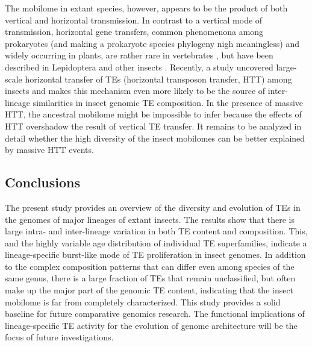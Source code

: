 The mobilome in extant species, however, appears to be the product of
both vertical and horizontal transmission. In contrast to a vertical
mode of transmission, horizontal gene transfers, common phenomenona
among prokaryotes (and making a prokaryote species phylogeny nigh
meaningless) and widely occurring in plants, are rather rare in
vertebrates \citep{Syvanen2012,Wallau2012}, but have been described in Lepidoptera
\citep{Sormacheva2012} and other insects \citep{Nakabachi2015}. Recently, a
study uncovered large-scale horizontal transfer of TEs (horizontal
transposon transfer, HTT) among insects \citep{Peccoud2017} and makes
this mechanism even more likely to be the source of inter-lineage
similarities in insect genomic TE composition. In the presence of
massive HTT, the ancestral mobilome might be impossible to infer because
the effects of HTT overshadow the result of vertical TE transfer. It
remains to be analyzed in detail whether the high diversity of the
insect mobilomes can be better explained by massive HTT events.

\subsection{Conclusions}

The present study provides an overview of the diversity and evolution of TEs in
the genomes of major lineages of extant insects.  The results show that there
is large intra- and inter-lineage variation in both TE content and composition.
This, and the highly variable age distribution of individual TE superfamilies,
indicate a lineage-specific burst-like mode of TE proliferation in insect
genomes.  In addition to the complex composition patterns that can differ even
among species of the same genus, there is a large fraction of TEs that remain
unclassified, but often make up the major part of the genomic TE content,
indicating that the insect mobilome is far from completely characterized.  This
study provides a solid baseline for future comparative genomics research.  The
functional implications of lineage-specific TE activity for the evolution of
genome architecture will be the focus of future investigations.
